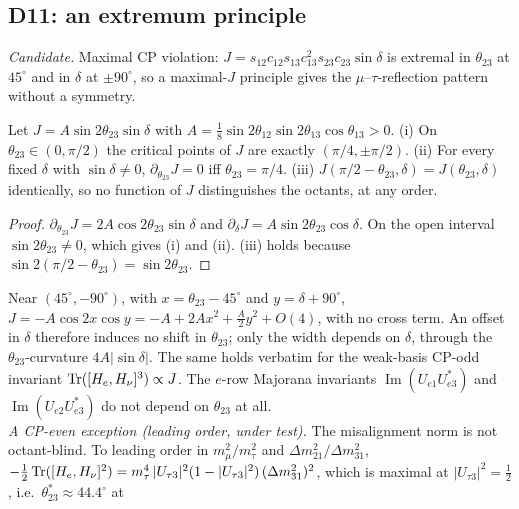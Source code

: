 \subsection{D11: an extremum principle}\label{sec:D11}
\emph{Candidate.} Maximal CP violation:
$J=s_{12}c_{12}s_{13}c_{13}^2s_{23}c_{23}\sin\delta$ is extremal in $\theta_{23}$ at $45^\circ$ and
in $\delta$ at $\pm90^\circ$, so a maximal-$J$ principle gives the $\mu$--$\tau$-reflection pattern
without a symmetry.\\
\begin{proposition}\label{prop:Jextremum}
Let $J=A\sin2\theta_{23}\sin\delta$ with $A=\tfrac18\sin2\theta_{12}\sin2\theta_{13}\cos\theta_{13}>0$.
(i) On $\theta_{23}\in(0,\pi/2)$ the critical points of $J$ are exactly $(\pi/4,\pm\pi/2)$.
(ii) For every fixed $\delta$ with $\sin\delta\neq0$, $\partial_{\theta_{23}}J=0$ iff
$\theta_{23}=\pi/4$.
(iii) $J(\pi/2-\theta_{23},\delta)=J(\theta_{23},\delta)$ identically, so no function of $J$
distinguishes the octants, at any order.
\end{proposition}
\begin{proof}
$\partial_{\theta_{23}}J=2A\cos2\theta_{23}\sin\delta$ and $\partial_\delta J=A\sin2\theta_{23}\cos\delta$.
On the open interval $\sin2\theta_{23}\neq0$, which gives (i) and (ii). (iii) holds because
$\sin2(\pi/2-\theta_{23})=\sin2\theta_{23}$.
\end{proof}
\noindent Near $(45^\circ,-90^\circ)$, with $x=\theta_{23}-45^\circ$ and $y=\delta+90^\circ$,
$J=-A\cos2x\cos y=-A+2Ax^2+\tfrac{A}{2}y^2+O(4)$, with no cross term. An offset in $\delta$
therefore induces no shift in $\theta_{23}$; only the width depends on $\delta$, through the
$\theta_{23}$-curvature $4A|\sin\delta|$. The same holds verbatim for the weak-basis CP-odd invariant
$\operatorname{Tr}([H_e,H_\nu]^3)\propto J$. The $e$-row Majorana invariants $\operatorname{Im}(U_{e1}U_{e3}^*)$ and
$\operatorname{Im}(U_{e2}U_{e3}^*)$ do not depend on $\theta_{23}$ at all.\\
\emph{A CP-even exception (leading order, under test).} The misalignment norm is not octant-blind.
To leading order in $m_\mu^2/m_\tau^2$ and $\Delta m^2_{21}/\Delta m^2_{31}$,
$-\tfrac12\operatorname{Tr}([H_e,H_\nu]^2)=m_\tau^4\,|U_{\tau3}|^2(1-|U_{\tau3}|^2)\,(\Delta m^2_{31})^2$, which is
maximal at $|U_{\tau3}|^2=\tfrac12$, i.e.\ $\theta_{23}^*\approx44.4^\circ$ at

